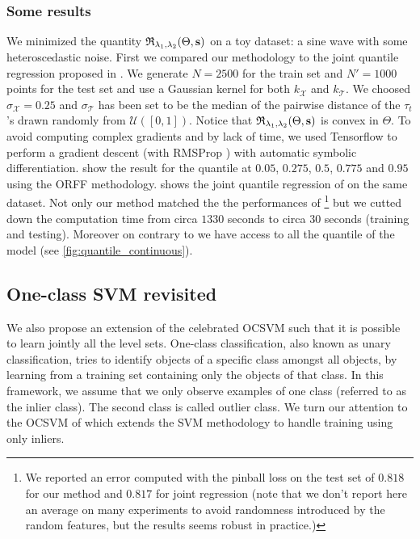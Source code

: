 \subsubsection{Some results}
We minimized the quantity $\mathfrak{R}_{\lambda_1, \lambda_2}(\Theta,
\boldsymbol{\mathbf{s}})$ on a toy dataset: a sine wave with some heteroscedastic noise. First
we compared our methodology to the joint quantile regression proposed in
\citet{sangnier2016joint}. We generate $N=2500$ for the train set and $N'=1000$
points for the test set and use a Gaussian kernel for both $k_{\mathcal{X}}$
and $k_{\mathcal{T}}$. We choosed $\sigma_{\mathcal{X}} = 0.25$ and
$\sigma_{\mathcal{T}}$ has been set to be the median of the pairwise distance
of the $\tau_t$'s drawn randomly from $\mathcal{U}([0, 1])$. Notice that
$\mathfrak{R}_{\lambda_1, \lambda_2}(\Theta, \boldsymbol{\mathbf{s}})$ is convex in $\Theta$.
To avoid computing complex gradients and by lack of time, we used Tensorflow
\citep{abadi2016tensorflow} to perform a gradient descent (with RMSProp
\citep{tieleman2012lecture}) with automatic symbolic differentiation.
 show the result for the quantile at $0.05$, $0.275$,
$0.5$, $0.775$ and $0.95$ using the \acs{ORFF} methodology.
 shows the joint quantile regression of
\citet{sangnier2016joint} on the same dataset. Not only our method matched the
the performances of \citet{sangnier2016joint}\footnote{We reported an error
computed with the pinball loss on the test set of $0.818$ for our method and
$0.817$ for joint regression (note that we don't report here an average on many
experiments to avoid randomness introduced by the random features, but the
results seems robust in practice.)} but we cutted down the computation time
from circa $1330$ seconds to circa $30$ seconds (training and testing).
Moreover on contrary to \citet{sangnier2016joint} we have access to all the
quantile of the model (see \cref{fig:quantile_continuous}).

\subsection{One-class SVM revisited}
We also propose an extension of the celebrated \acf{OCSVM} such that it is
possible to learn jointly all the level sets.  One-class classification, also
known as unary classification, tries to identify objects of a specific class
amongst all objects, by learning from a training set containing only the
objects of that class.  In this framework, we assume that we only observe
examples of one class (referred to as the inlier class).  The second class is
called outlier class.  We turn our attention to the \acs{OCSVM}
of \citet{Scholkopf2001} which extends the \ac{SVM} methodology
\citep{Cortes1995,Shawe2004} to handle training using only inliers.
